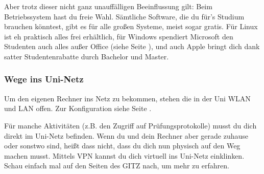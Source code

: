 			Aber trotz dieser nicht ganz unauffälligen Beeinflussung gilt: Beim Betriebssystem hast du freie Wahl. Sämtliche Software, die du für's Studium brauchen  könntest, gibt es für alle großen Systeme, meist sogar gratis. Für Linux ist eh  praktisch alles frei erhältlich, für Windows spendiert Microsoft den Studenten auch alles außer Office (siehe Seite \pageref{msdnaa}), und auch Apple bringt dich dank satter Studentenrabatte durch Bachelor und Master. 

		\subsubsection{Wege ins Uni-Netz}
			Um den eigenen Rechner ins Netz zu bekommen, stehen die in der Uni WLAN und LAN offen. Zur Konfiguration siehe Seite \pageref{wlan}.

			Für manche Aktivitäten (z.B. den Zugriff auf Prüfungsprotokolle) musst du dich direkt im Uni-Netz befinden. Wenn du und dein Rechner aber gerade zuhause oder sonstwo sind, heißt dass nicht, dass du dich nun physisch auf den Weg machen musst. Mittels VPN kannst du dich virtuell ins Uni-Netz einklinken. Schau einfach mal auf den Seiten des GITZ nach, um mehr zu erfahren.
